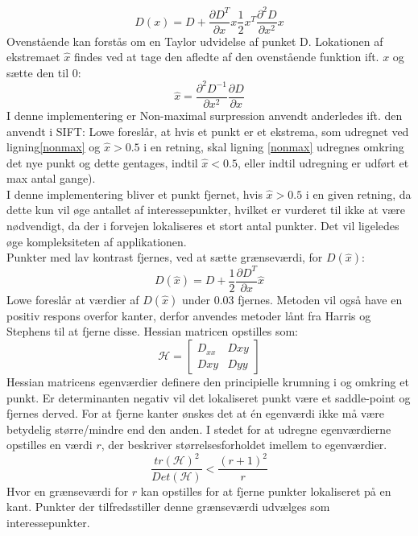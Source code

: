 \begin{equation}
D(x)=D+\dfrac{\partial D^T}{\partial x}x\dfrac{1}{2}x^T\dfrac{\partial^2D}{\partial x^2}x
\label{nonmax}
\end{equation}
Ovenstående kan forstås om en Taylor udvidelse af punket D.
Lokationen af ekstremaet $\hat{x}$ findes ved at tage den afledte af den ovenstående funktion ift. $x$ og sætte den til 0:
\begin{equation}
\hat{x}= \dfrac{\partial^2 D^{-1}}{\partial x^2}\dfrac{\partial D}{\partial x}
\label{xhat}
\end{equation}
I denne implementering er Non-maximal surpression anvendt anderledes ift. den anvendt i SIFT: Lowe foreslår, at hvis et punkt er et ekstrema, som udregnet ved ligning\ref{nonmax} og $\hat{x} > 0.5$ i en retning, skal ligning \eqref{nonmax} udregnes omkring det nye punkt og dette gentages, indtil $\hat{x} < 0.5$, eller indtil udregning er udført et max antal gange).
\\
I denne implementering bliver et punkt fjernet, hvis $\hat{x} > 0.5$ i en given retning, da dette kun vil øge antallet af interessepunkter, hvilket er vurderet til ikke at være nødvendigt, da der i forvejen lokaliseres et stort antal punkter. Det vil ligeledes øge kompleksiteten af applikationen.
\\
Punkter med lav kontrast fjernes, ved at sætte grænseværdi, for $D(\hat{x})$:
\begin{equation}
D(\hat{x})=D+\dfrac{1}{2}\dfrac{\partial D^T}{\partial x}\hat{x}
\label{dxhat}
\end{equation}
Lowe foreslår at værdier af $D(\hat{x})$ under 0.03 fjernes. Metoden vil også have en positiv respons overfor kanter, derfor anvendes metoder lånt fra Harris og Stephens \cite{harris} til at fjerne disse. Hessian matricen opstilles som:
\begin{equation}
\mathcal{H} =
\begin{bmatrix}
D_{xx} & D{xy} \\
D{xy} & D{yy}
\end{bmatrix}
\end{equation}
Hessian matricens egenværdier definere den principielle krumning i og omkring et punkt. Er determinanten negativ vil det lokaliseret punkt være et saddle-point og fjernes derved. For at fjerne kanter ønskes det at én egenværdi ikke må være betydelig større/mindre end den anden. I stedet for at udregne egenværdierne opstilles en værdi $r$, der beskriver størrelsesforholdet imellem to egenværdier.
\begin{equation}
\dfrac{tr(\mathcal{H})^2}{Det(\mathcal{H})}<\dfrac{(r+1)^2}{r}
\label{rval}
\end{equation}
Hvor en grænseværdi for $r$ kan opstilles for at fjerne punkter lokaliseret på en kant. Punkter der tilfredsstiller denne grænseværdi udvælges som interessepunkter. 
